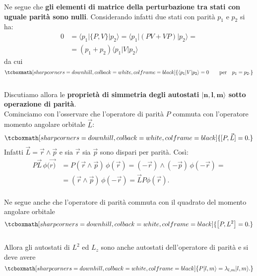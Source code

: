 Ne segue che \textbf{gli elementi di matrice della perturbazione tra stati con uguale parità sono nulli}. Considerando infatti due stati con parità $p_1$ e $p_2$ si ha:
	\begin{align}
		0 & =  \langle p_1 | \{ P,V \} |p_2\rangle= \langle p_1 | \left( PV+VP \right) |p_2 \rangle = \nonumber \\
		 & =  (p_1+p_2)\langle p_1|V|p_2\rangle 
	\end{align}
da cui 
	\begin{equation}
	\label{eq:cap23_2}
		\tcboxmath[sharp corners=downhill, colback=white, colframe=black]{
		\langle p_1| V |p_2\rangle=0 \qquad \textrm{per} \quad p_1=p_2.
		}
	\end{equation}\\
	
Discutiamo allora le \textbf{proprietà di simmetria degli autostati $\boldsymbol{|n,l,m \rangle}$ sotto operazione di parità}.\\

Cominciamo con l'osservare che l'operatore di parità $P$ commuta con l'operatore momento angolare orbitale $\vec{L}$:
	\begin{equation}
		\tcboxmath[sharp corners=downhill, colback=white, colframe=black]{
			[ P, \vec{L} ]=0.
			}
	\end{equation}
Infatti $\vec{L}=\vec{r}\wedge \vec{p}$ e sia $\vec{r}$ sia $\vec{p}$ sono dispari per parità. Così:
	\begin{align}
		P\vec{L}\, \phi(\vec{r)} & =  P(\vec{r}\wedge\vec{p})\, \phi(\vec{r})= (-\vec{r}) \wedge (-\vec{p})\,\phi(-\vec{r})= \nonumber \\
		& =  (\vec{r} \wedge \vec{p})\,\phi( -\vec{r})=\vec{L}P\phi(\vec{r}).
	\end{align}\\

Ne segue anche che l'operatore di parità commuta con il quadrato del momento angolare orbitale
	\begin{equation}
		\tcboxmath[sharp corners=downhill, colback=white, colframe=black]{
				\left[ P,L^2\right]=0.
				}
	\end{equation}\\

Allora gli autostati di $L^2$ ed $L_z$ sono anche autostati dell'operatore di parità e si deve avere
	\begin{equation}
		\tcboxmath[sharp corners=downhill, colback=white, colframe=black]{
			P|l,m\rangle=\lambda_{l,m}|l,m\rangle.
			}
	\end{equation}\\

